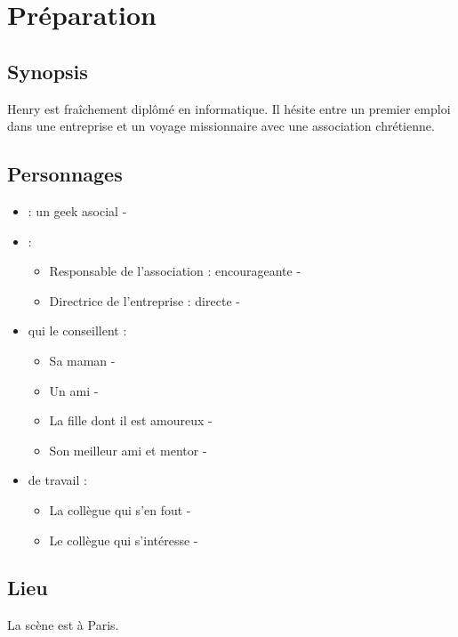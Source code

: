 \section{Préparation}

	\subsection{Synopsis}

	Henry est fraîchement diplômé en informatique.
	Il hésite entre un premier emploi dans une entreprise
	et un voyage missionnaire avec une association
	chrétienne.

	\subsection{Personnages}
	
	\begin{itemize}
	\item {} : un geek asocial - 
	\item {} : 
		\begin{itemize}
		\item Responsable de l'association : encourageante  -  
		\item Directrice de l'entreprise : directe - 
		\end{itemize}
	\item {} qui le conseillent :
		\begin{itemize}
		\item Sa maman - 
		\item Un ami - 
		\item La fille dont il est amoureux - 
		\item Son meilleur ami et mentor - 
		\end{itemize}
	\item {} de travail :
		\begin{itemize}
		\item La collègue qui s'en fout - 
		\item Le collègue qui s'intéresse - 
		\end{itemize}
	\end{itemize}
	
	\subsection{Lieu}
	
	La scène est à Paris.